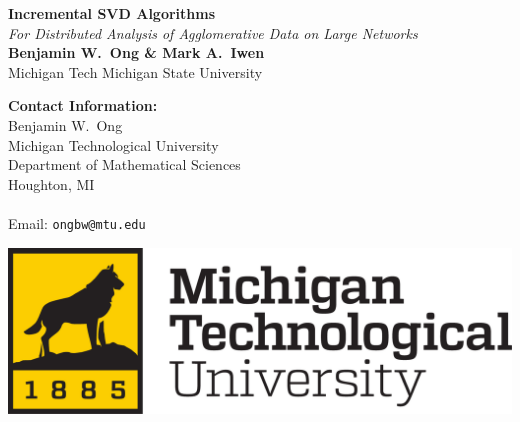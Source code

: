\documentclass[a0,landscape]{a0poster}
\begin{document}


\begin{minipage}[b]{0.58\linewidth}
  \veryHuge \color{NavyBlue} \textbf{Incremental SVD Algorithms} \color{Black}\\ %
  \Huge\textit{For Distributed Analysis of Agglomerative Data on Large Networks}\\[1cm] %
  \huge \textbf{Benjamin W.~Ong \quad \& \quad Mark A.~Iwen}\\ %
  \huge Michigan Tech \hspace*{3.2in} Michigan State University\\ %
\end{minipage}
%
\begin{minipage}[b]{0.22\linewidth}
  \Large \textbf{Contact Information:}\\
  Benjamin W.~Ong\\
  Michigan Technological University\\
  Department of Mathematical Sciences \\
  Houghton, MI\\\\
  Email: \texttt{ongbw@mtu.edu}\\ %
\end{minipage}
%
\begin{minipage}[b]{0.19\linewidth}
  \includegraphics[width=20cm]{figures/logo.png} %
  \vspace*{2in}
\end{minipage}
\end{document}
